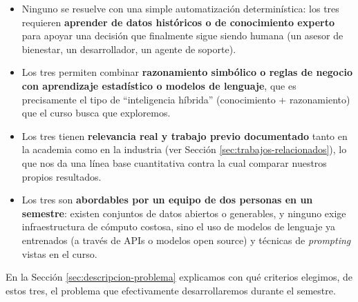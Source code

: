 \begin{itemize}
    \item Ninguno se resuelve con una simple automatización determinística: los tres requieren \textbf{aprender de datos históricos o de conocimiento experto} para apoyar una decisión que finalmente sigue siendo humana (un asesor de bienestar, un desarrollador, un agente de soporte).
    \item Los tres permiten combinar \textbf{razonamiento simbólico o reglas de negocio con aprendizaje estadístico o modelos de lenguaje}, que es precisamente el tipo de ``inteligencia híbrida'' (conocimiento + razonamiento) que el curso busca que exploremos.
    \item Los tres tienen \textbf{relevancia real y trabajo previo documentado} tanto en la academia como en la industria (ver Sección \ref{sec:trabajos-relacionados}), lo que nos da una línea base cuantitativa contra la cual comparar nuestros propios resultados.
    \item Los tres son \textbf{abordables por un equipo de dos personas en un semestre}: existen conjuntos de datos abiertos o generables, y ninguno exige infraestructura de cómputo costosa, sino el uso de modelos de lenguaje ya entrenados (a través de APIs o modelos open source) y técnicas de \textit{prompting} vistas en el curso.
\end{itemize}

En la Sección \ref{sec:descripcion-problema} explicamos con qué criterios elegimos, de estos tres, el problema que efectivamente desarrollaremos durante el semestre.

\pagebreak

